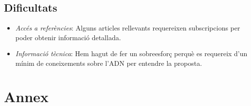 \documentclass[a4paper]{article}
\begin{document}
	\subsection{Dificultats}
	\begin{itemize}
		\item \emph{Accés a referències}: Alguns articles rellevants requereixen subscripcions per poder obtenir informació detallada.
		\item \emph{Informació tècnica}: Hem hagut de fer un sobreesforç perquè es requereix d'un mínim de coneixements sobre l'ADN per entendre la proposta.
	\end{itemize}

	\section{Annex}
	\label{sec:annex}
	
	
\end{document}
